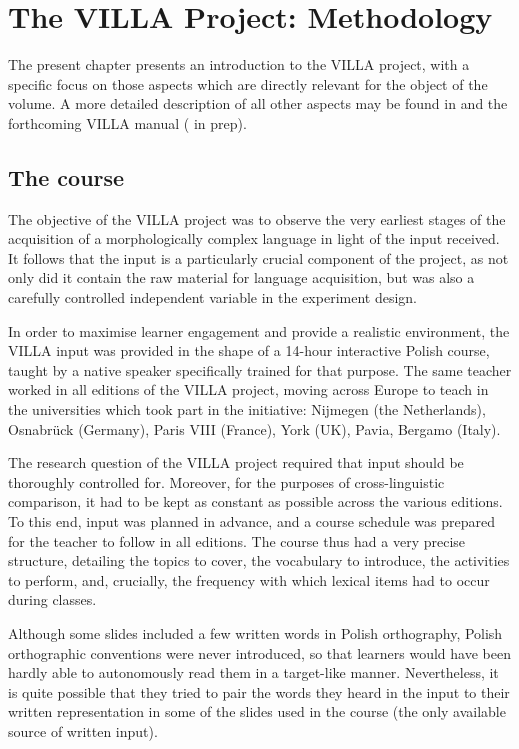 \chapter{The VILLA Project: Methodology}\label{sec:2}

The present chapter presents an introduction to the VILLA project, with a specific focus on those aspects which are directly relevant for the object of the volume. A more detailed description of all other aspects may be found in \citet{DimrothEtAl2013} and the forthcoming VILLA manual (\citeauthor{WatorekEtAlND} in prep).

\section{The course}\label{sec:02:1}

The objective of the VILLA project was to observe the very earliest stages of the acquisition of a morphologically complex language in light of the input received. It follows that the input is a particularly crucial component of the project, as not only did it contain the raw material for language acquisition, but was also a carefully controlled independent variable in the experiment design. 

In order to maximise learner engagement and provide a realistic environment, the VILLA input was provided in the shape of a 14-hour interactive Polish course, taught by a native speaker specifically trained for that purpose. The same teacher worked in all editions of the VILLA project, moving across Europe to teach in the universities which took part in the initiative: Nijmegen (the Netherlands), Osnabrück (Germany), Paris VIII (France), York (UK), Pavia, Bergamo (Italy).

The research question of the VILLA project required that input should be thoroughly controlled for. Moreover, for the purposes of cross-linguistic comparison, it had to be kept as constant as possible across the various editions. To this end, input was planned in advance, and a course schedule was prepared for the teacher to follow in all editions. The course thus had a very precise structure, detailing the topics to cover, the vocabulary to introduce, the activities to perform, and, crucially, the frequency with which lexical items had to occur during classes. 

Although some slides included a few written words in Polish orthography, Polish orthographic conventions were never introduced, so that learners would have been hardly able to autonomously read them in a target-like manner. Nevertheless, it is quite possible that they tried to pair the words they heard in the input to their written representation in some of the slides used in the course (the only available source of written input).

